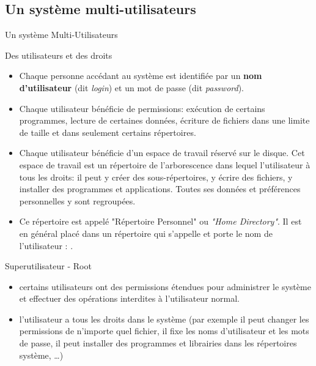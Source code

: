 \subsection{Un système multi-utilisateurs}
\begin{frame}{Un système Multi-Utilisateurs}
  \begin{block}{Des utilisateurs et des droits}
    \begin{itemize}
    \item Chaque personne accédant au système est identifiée par un
      \textbf{nom d'utilisateur} (dit \textit{login}) et un mot de passe
      (dit \textit{password}).
    \item Chaque utilisateur bénéficie de permissions: exécution de
      certains programmes, lecture de certaines données, écriture de
      fichiers dans une limite de taille et dans seulement certains
      répertoires.
    \item Chaque utilisateur bénéficie d'un espace de travail réservé
      sur le disque. Cet espace de travail est un répertoire de
      l'arborescence dans lequel l'utilisateur à tous les droits: il
      peut y créer des sous-répertoires, y écrire des fichiers, y
      installer des programmes et applications. Toutes ses données et
      préférences personnelles y sont regroupées.
    \item Ce répertoire est appelé "Répertoire Personnel" ou
      \textit{"Home Directory"}. Il est en général placé dans un
      répertoire qui s'appelle  et porte le nom de
      l'utilisateur : .
    \end{itemize}
  \end{block}
  \begin{alertblock}{Superutilisateur - Root}
    \begin{itemize}
    \item certains utilisateurs ont des permissions étendues pour
      administrer le système et effectuer des opérations interdites à
      l'utilisateur normal.
    \item l'utilisateur  a tous les droits dans le système
      (par exemple il peut changer les permissions de n'importe quel
      fichier, il fixe les noms d'utilisateur et les mots de passe, il
      peut installer des programmes et librairies dans les répertoires
      système, \dots)
    \end{itemize}
  \end{alertblock}
\end{frame}

